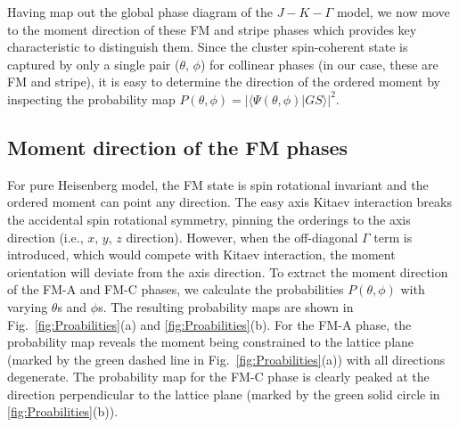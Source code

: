 \documentclass[aps,prb,reprint,amsfonts,amsmath,amssymb,showpacs,groupedaddress,superscriptaddress]{revtex4-1}
\begin{document}
Having map out the global phase diagram of the $J-K-\Gamma$ model, we now move to the moment direction of these FM and stripe phases which provides key characteristic to distinguish them. Since the cluster spin-coherent state is captured by only a single pair ($\theta$, $\phi$) for collinear phases (in our case, these are FM and stripe), it is easy to determine the direction of the ordered moment by inspecting the probability map $P(\theta, \phi) = | \langle \Psi (\theta, \phi) | GS \rangle |^2$.

\subsection{\label{sec:SectionVA}Moment direction of the FM phases}
For pure Heisenberg model, the FM state is spin rotational invariant and the ordered moment can point any direction. The easy axis Kitaev interaction breaks the accidental spin rotational symmetry, pinning the orderings to the axis direction (i.e., $x$, $y$, $z$ direction). However, when the off-diagonal $\Gamma$ term is introduced, which would compete with Kitaev interaction, the moment orientation will deviate from the axis direction. To extract the moment direction of the FM-A and FM-C phases, we calculate the probabilities $P(\theta, \phi)$ with varying $\theta$s and $\phi$s. The resulting probability maps are shown in Fig.~\ref{fig:Proabilities}(a) and \ref{fig:Proabilities}(b). For the FM-A phase, the probability map reveals the moment being constrained to the lattice plane (marked by the green dashed line in Fig.~\ref{fig:Proabilities}(a)) with all directions degenerate. The probability map for the FM-C phase is clearly peaked at the direction perpendicular to the lattice plane (marked by the green solid circle in \ref{fig:Proabilities}(b)).
\end{document}
